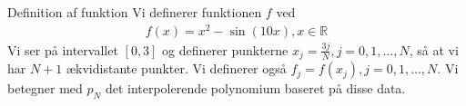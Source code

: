 \begin{frame}{Definition af funktion}
    Vi definerer funktionen $f$ ved
    \begin{align*}
    f(x)=x^2-\sin(10x), x \in \mathbb{R}
    \end{align*}
    Vi ser på intervallet $\left [0,3 \right ]$ og definerer punkterne $x_j = \frac{3j}{N}, j = 0, 1, \ldots, N$, så at vi har $N+1$ ækvidistante punkter. Vi definerer også $f_j=f(x_j), j=0,1,\ldots,N.$ Vi betegner med $p_N$ det interpolerende polynomium baseret på disse data.  
\end{frame}